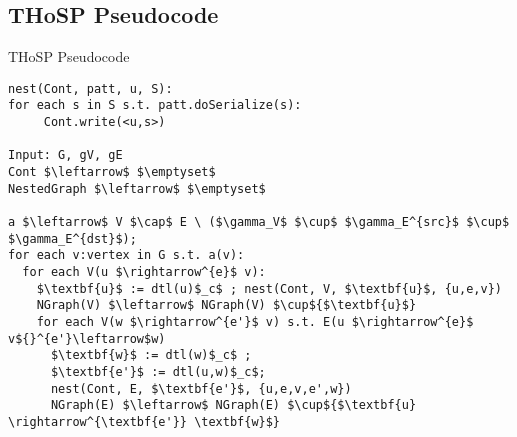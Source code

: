 \subsection{THoSP Pseudocode}
\begin{frame}[fragile]{THoSP Pseudocode}
	\begin{lstlisting}[mathescape=true,language=pseudi]
nest(Cont, patt, u, S):
for each s in S s.t. patt.doSerialize(s):
     Cont.write(<u,s>)

Input: G, gV, gE 
Cont $\leftarrow$ $\emptyset$ 
NestedGraph $\leftarrow$ $\emptyset$ 

a $\leftarrow$ V $\cap$ E \ ($\gamma_V$ $\cup$ $\gamma_E^{src}$ $\cup$ $\gamma_E^{dst}$);
for each v:vertex in G s.t. a(v):
  for each V(u $\rightarrow^{e}$ v):
    $\textbf{u}$ := dtl(u)$_c$ ; nest(Cont, V, $\textbf{u}$, {u,e,v})
    NGraph(V) $\leftarrow$ NGraph(V) $\cup${$\textbf{u}$}
    for each V(w $\rightarrow^{e'}$ v) s.t. E(u $\rightarrow^{e}$ v${}^{e'}\leftarrow$w)
      $\textbf{w}$ := dtl(w)$_c$ ;
      $\textbf{e'}$ := dtl(u,w)$_c$; 
      nest(Cont, E, $\textbf{e'}$, {u,e,v,e',w})
      NGraph(E) $\leftarrow$ NGraph(E) $\cup${$\textbf{u} \rightarrow^{\textbf{e'}} \textbf{w}$}
	\end{lstlisting}
	
\end{frame}
